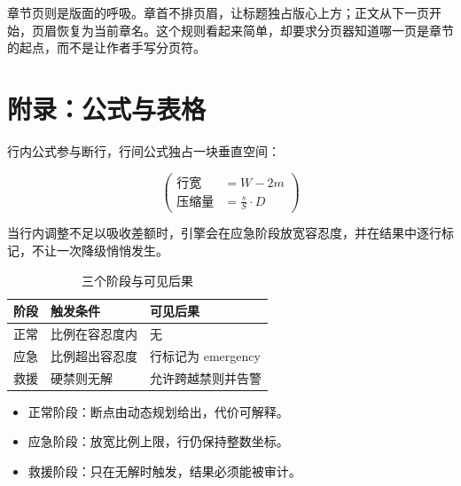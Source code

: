 \documentclass{article}
\begin{document}
章节页则是版面的呼吸。章首不排页眉，让标题独占版心上方；正文从下一页开始，页眉恢复为当前章名。这个规则看起来简单，却要求分页器知道哪一页是章节的起点，而不是让作者手写分页符。

\section{附录：公式与表格}

行内公式参与断行，行间公式独占一块垂直空间：

\[ \left( \begin{aligned} \text{行宽} &= W - 2m \\ \text{压缩量} &= \frac{s}{S} \cdot D \end{aligned} \right) \]

当行内调整不足以吸收差额时，引擎会在应急阶段放宽容忍度，并在结果中逐行标记，不让一次降级悄悄发生。

\begin{table}
\caption{三个阶段与可见后果}
\begin{tabular}{lll}
阶段 & 触发条件 & 可见后果 \\ \midrule
正常 & 比例在容忍度内 & 无 \\
应急 & 比例超出容忍度 & 行标记为 emergency \\
救援 & 硬禁则无解 & 允许跨越禁则并告警 \\
\end{tabular}
\end{table}

\begin{itemize}
\item 正常阶段：断点由动态规划给出，代价可解释。
\item 应急阶段：放宽比例上限，行仍保持整数坐标。
\item 救援阶段：只在无解时触发，结果必须能被审计。
\end{itemize}
\end{document}
